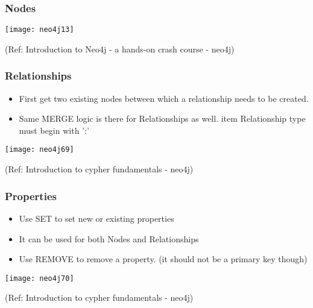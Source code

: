 \begin{frame}[fragile]\frametitle{Nodes}


\begin{center}
\texttt{[image: neo4j13]}
\end{center}	  


{\tiny (Ref: Introduction to Neo4j - a hands-on crash course  - neo4j)}

\end{frame}


\begin{frame}[fragile]\frametitle{Relationships}

\begin{itemize}
\item First get two existing nodes between which a relationship needs to be created.
\item Same MERGE logic is there for Relationships as well.
item Relationship type must begin with ':'
\end{itemize}

\begin{center}
\texttt{[image: neo4j69]}
\end{center}	  


{\tiny (Ref: Introduction to cypher fundamentals  - neo4j)}

\end{frame}

\begin{frame}[fragile]\frametitle{Properties}

\begin{itemize}
\item Use SET to set new or existing properties
\item It can be used for both Nodes and Relationships
\item Use REMOVE to remove a property. (it should not be a primary key though)
\end{itemize}

\begin{center}
\texttt{[image: neo4j70]}
\end{center}	  


{\tiny (Ref: Introduction to cypher fundamentals  - neo4j)}

\end{frame}


